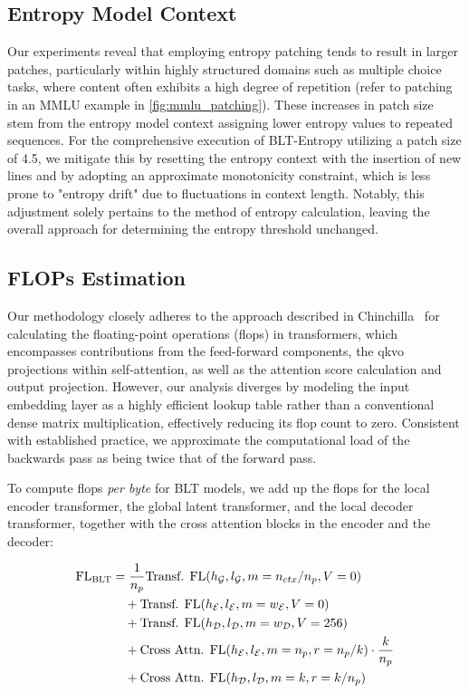 \subsection{Entropy Model Context}
\label{section:entropy-context}
Our experiments reveal that employing entropy patching tends to result in larger patches, particularly within highly structured domains such as multiple choice tasks, where content often exhibits a high degree of repetition (refer to patching in an MMLU example in \autoref{fig:mmlu_patching}). These increases in patch size stem from the entropy model context assigning lower entropy values to repeated sequences. For the comprehensive execution of {\textsc BLT}-Entropy utilizing a patch size of 4.5, we mitigate this by resetting the entropy context with the insertion of new lines and by adopting an approximate monotonicity constraint, which is less prone to "entropy drift" due to fluctuations in context length. Notably, this adjustment solely pertains to the method of entropy calculation, leaving the overall approach for determining the entropy threshold unchanged.

\subsection{FLOPs Estimation} 
\label{section:flops}

Our methodology closely adheres to the approach described in Chinchilla~\citep{hoffmann2022training} for calculating the floating-point operations (flops) in transformers, which encompasses contributions from the feed-forward components, the qkvo projections within self-attention, as well as the attention score calculation and output projection. However, our analysis diverges by modeling the input embedding layer as a highly efficient lookup table rather than a conventional dense matrix multiplication, effectively reducing its flop count to zero. Consistent with established practice, we approximate the computational load of the backwards pass as being twice that of the forward pass.

To compute flops \textit{per byte} for {\textsc BLT} models, we add up the flops for the local encoder transformer, the global latent transformer, and the local decoder transformer, together with the cross attention blocks in the encoder and the decoder:

\begin{align}
    \text{FL}_{\text{{\textsc BLT}}} &= \frac{1}{n_p} \text{Transf. FL}(h_{\mathcal{G}}, l_{\mathcal{G}}, m=n_{ctx}/n_p, V=0)\\
   &\quad+ \text{Transf. FL}(h_{\mathcal{E}}, l_{\mathcal{E}}, m=w_{\mathcal{E}}, V=0) \\
   &\quad+ \text{Transf. FL}(h_{\mathcal{D}}, l_{\mathcal{D}}, m=w_{\mathcal{D}}, V=256) \\ 
    &\quad+ \text{Cross Attn. FL}(h_{\mathcal{E}}, l_{\mathcal{E}}, m=n_p, r=n_p/k) \cdot \frac{k}{n_p} \\ 
   &\quad+ \text{Cross Attn. FL}(h_{\mathcal{D}}, l_{\mathcal{D}}, m=k, r=k/n_p)
\end{align}

